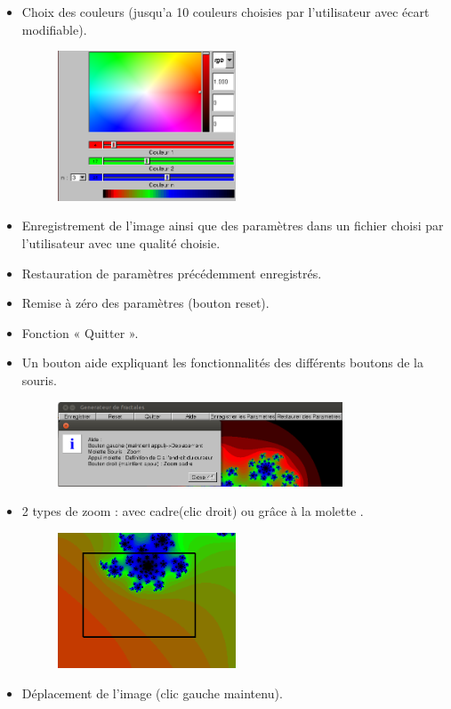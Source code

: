 \documentclass[a4paper,11pt]{article} \usepackage[T1]{fontenc} \usepackage[utf8]{inputenc} \usepackage[francais]{babel}
\begin{document}
\begin{itemize}
  \item Choix des couleurs (jusqu'a 10 couleurs choisies par l’utilisateur avec écart modifiable).
        \begin{figure}[H] \begin{center} \includegraphics[width=0.5\textwidth]{Images/ChoixCouleurs.png}
            \caption{}
        \end{center} \end{figure}
  \item Enregistrement de l’image ainsi que des paramètres dans un fichier choisi par l’utilisateur avec une qualité choisie.
  \item Restauration de paramètres précédemment enregistrés.
  \item Remise à zéro des paramètres (bouton reset).
  \item Fonction « Quitter ».
  \item Un bouton aide expliquant les fonctionnalités des différents boutons de la souris.
        \begin{figure}[H] \begin{center} \includegraphics[width=0.8\textwidth]{Images/Aide.png}
            \caption{}
        \end{center} \end{figure}
  \item 2 types de zoom : avec cadre(clic droit) ou grâce à la molette .
        \begin{figure}[H] \begin{center} \includegraphics[width=0.5\textwidth]{Images/Cadre.png}
            \caption{}
        \end{center} \end{figure}
  \item Déplacement de l’image (clic gauche maintenu).
\end{itemize}
\end{document}
